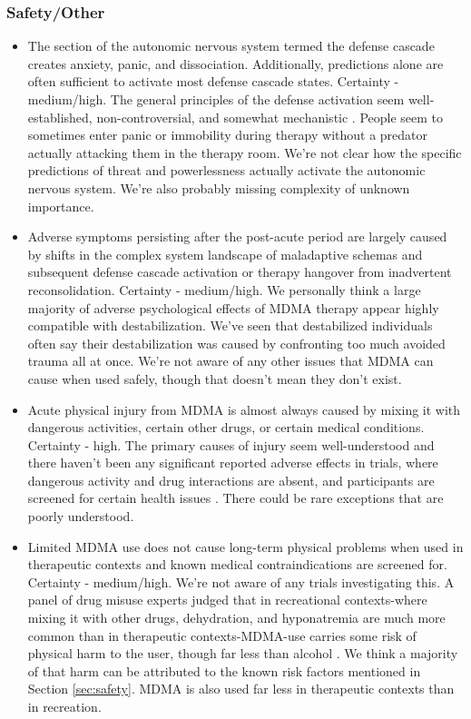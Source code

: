 \documentclass[12pt,letterpaper]{book}
\begin{document}
\subsubsection*{Safety/Other}
\begin{itemize}
	\item The section of the autonomic nervous system termed the defense cascade creates anxiety, panic, and dissociation. Additionally, predictions alone are often sufficient to activate most defense cascade states. Certainty - medium/high. The general principles of the defense activation seem well-established, non-controversial, and somewhat mechanistic \cite{kozlowskaDefenseCascade}. People seem to sometimes enter panic or immobility during therapy without a predator actually attacking them in the therapy room. We're not clear how the specific predictions of threat and powerlessness actually activate the autonomic nervous system. We're also probably missing complexity of unknown importance.
	\item Adverse symptoms persisting after the post-acute period are largely caused by shifts in the complex system landscape of maladaptive schemas and subsequent defense cascade activation or therapy hangover from inadvertent reconsolidation. Certainty - medium/high. We personally think a large majority of adverse psychological effects of MDMA therapy appear highly compatible with destabilization. We've seen that destabilized individuals often say their destabilization was caused by confronting too much avoided trauma all at once. We're not aware of any other issues that MDMA can cause when used safely, though that doesn't mean they don't exist.
	\item Acute physical injury from MDMA is almost always caused by mixing it with dangerous activities, certain other drugs, or certain medical conditions. Certainty - high. The primary causes of injury seem well-understood and there haven't been any significant reported adverse effects in trials, where dangerous activity and drug interactions are absent, and participants are screened for certain health issues \textcite{wolfgang2025}. There could be rare exceptions that are poorly understood.
	\item Limited MDMA use does not cause long-term physical problems when used in therapeutic contexts and known medical contraindications are screened for. Certainty - medium/high. We're not aware of any trials investigating this. A panel of drug misuse experts judged that in recreational contexts-where mixing it with other drugs, dehydration, and hyponatremia are much more common than in therapeutic contexts-MDMA-use carries some risk of physical harm to the user, though far less than alcohol \cite{nuttDrugHarms}. We think a majority of that harm can be attributed to the known risk factors mentioned in Section \ref{sec:safety}. MDMA is also used far less in therapeutic contexts than in recreation.

\end{itemize}
\end{document}
